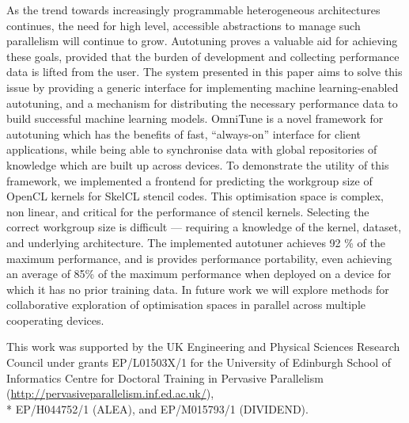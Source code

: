 \documentclass[nonatbib,preprint,9pt]{sigplanconf}
\begin{document}
As the trend towards increasingly programmable heterogeneous
architectures continues, the need for high level, accessible
abstractions to manage such parallelism will continue to
grow. Autotuning proves a valuable aid for achieving these goals,
provided that the burden of development and collecting performance
data is lifted from the user. The system presented in this paper aims
to solve this issue by providing a generic interface for implementing
machine learning-enabled autotuning, and a mechanism for distributing
the necessary performance data to build successful machine learning
models. OmniTune is a novel framework for autotuning which has the
benefits of fast, ``always-on'' interface for client applications,
while being able to synchronise data with global repositories of
knowledge which are built up across devices. To demonstrate the
utility of this framework, we implemented a frontend for predicting
the workgroup size of OpenCL kernels for SkelCL stencil codes. This
optimisation space is complex, non linear, and critical for the
performance of stencil kernels. Selecting the correct workgroup size
is difficult --- requiring a knowledge of the kernel, dataset, and
underlying architecture. The implemented autotuner achieves 92 \% of
the maximum performance, and is provides performance portability, even
achieving an average of 85\% of the maximum performance when deployed
on a device for which it has no prior training data. In future work we
will explore methods for collaborative exploration of optimisation
spaces in parallel across multiple cooperating devices.

\acks

This work was supported by the UK Engineering and Physical Sciences
Research Council under grants EP/L01503X/1 for the University of
Edinburgh School of Informatics Centre for Doctoral Training in
Pervasive Parallelism
(\url{http://pervasiveparallelism.inf.ed.ac.uk/}),\\* EP/H044752/1
(ALEA), and EP/M015793/1 (DIVIDEND).

\label{bibliography}
\printbibliography
\end{document}
